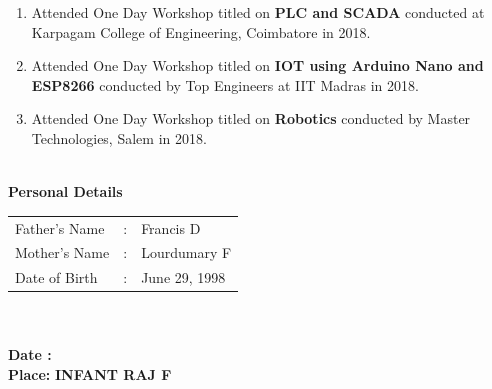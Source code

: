 \documentclass{article}
\begin{document}
\begin{flushleft}
\begin{itemize}
\begin{enumerate}
				\item Attended One Day Workshop titled on \textbf{PLC and SCADA} conducted at Karpagam College of Engineering, Coimbatore in 2018.
				\item Attended One Day Workshop titled on \textbf{IOT using Arduino Nano and ESP8266} conducted by Top Engineers at IIT Madras in 2018.
				\item Attended One Day Workshop titled on \textbf{Robotics} conducted by Master Technologies, Salem in 2018.
			\end{enumerate}
		\end{itemize}	
		\large \textbf{\\Personal Details}
		\begin{table}[h]
				\begin{tabular}{m{2.8cm} m{0.15cm} m{3cm} }
				\large Father's Name & \large : & \large Francis D\\ 
				\large Mother's Name & \large : & \large Lourdumary F\\
				\large Date of Birth & \large : & \large June 29, 1998\\
		\end{tabular} \end{table}\\
		\large \textbf{\\Date : }
		\large \textbf{\\Place:  }	\hspace{360pt}\textbf{INFANT RAJ F}
	\end{flushleft}
\end{document}
